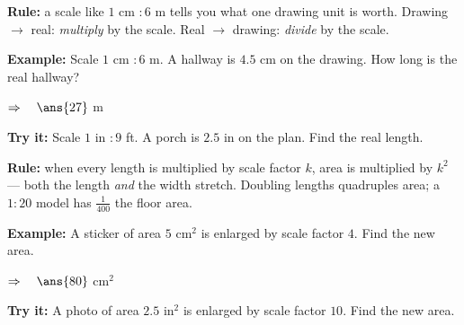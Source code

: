 \documentclass[12pt]{article}
\begin{document}

\begin{formulabox}
\textbf{Rule:} a scale like $1$ cm $: 6$ m tells you what one drawing unit is
worth. Drawing $\to$ real: \emph{multiply} by the scale. Real $\to$ drawing:
\emph{divide} by the scale.
\end{formulabox}

\begin{examplebox}
\textbf{Example:} \quad Scale $1$ cm $: 6$ m. A hallway is $4.5$ cm on the
drawing. How long is the real hallway?

$\Rightarrow\quad \ans{27}$ m
\end{examplebox}

\begin{tryitbox}
\textbf{Try it:} \quad Scale $1$ in $: 9$ ft. A porch is $2.5$ in on the plan.
Find the real length.\\[2pt]
\end{tryitbox}


\begin{formulabox}
\textbf{Rule:} when every length is multiplied by scale factor $k$, area is
multiplied by $k^2$ --- both the length \emph{and} the width stretch. Doubling
lengths quadruples area; a $1:20$ model has $\tfrac{1}{400}$ the floor area.
\end{formulabox}

\begin{examplebox}
\textbf{Example:} \quad A sticker of area $5$ cm$^2$ is enlarged by scale
factor $4$. Find the new area.

$\Rightarrow\quad \ans{80}$ cm$^2$
\end{examplebox}

\begin{tryitbox}
\textbf{Try it:} \quad A photo of area $2.5$ in$^2$ is enlarged by scale factor
$10$. Find the new area.\\[2pt]
\end{tryitbox}
\end{document}
